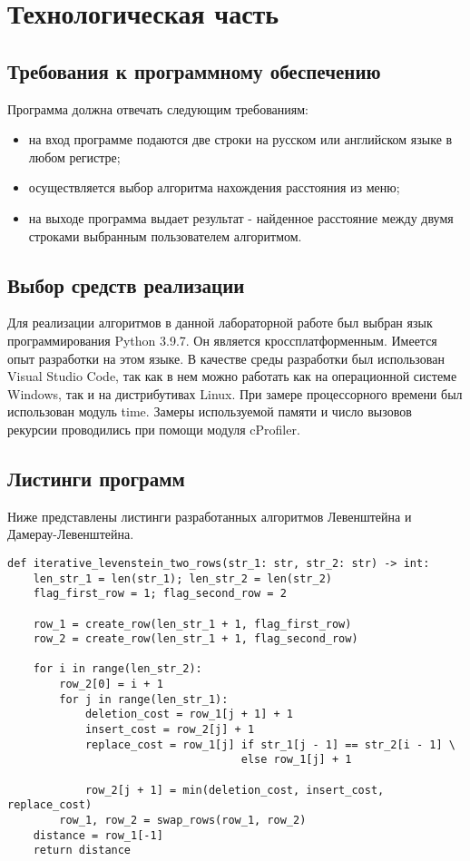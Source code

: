 \chapter{Технологическая часть}
\section{Требования к программному обеспечению}
Программа должна отвечать следующим требованиям:
\begin{itemize}
	\item на вход программе подаются две строки на русском или английском языке в любом регистре;
	\item осуществляется выбор алгоритма нахождения расстояния из меню;
	\item на выходе программа выдает результат - найденное расстояние между двумя строками выбранным пользователем алгоритмом.
\end{itemize}

\section{Выбор средств реализации}
Для реализации алгоритмов в данной лабораторной работе был выбран язык программирования Python 3.9.7\cite{python3}. Он является кроссплатформенным. Имеется опыт разработки на этом языке. В качестве среды разработки был использован Visual Studio Code\cite{vs}, так как в нем можно работать как на операционной системе Windows, так и на дистрибутивах Linux. При замере процессорного времени был использован модуль time\cite{time}. Замеры используемой памяти и число вызовов рекурсии проводились при помощи модуля cProfiler\cite{cprofile}.
\section{Листинги программ}
Ниже представлены листинги разработанных алгоритмов Левенштейна и Дамерау-Левенштейна.

\begin{lstlisting}[label=some-code,caption=Программный код нахождения расстояния Левенштейна итеративно с использованием двух строк]
def iterative_levenstein_two_rows(str_1: str, str_2: str) -> int:
	len_str_1 = len(str_1); len_str_2 = len(str_2)
	flag_first_row = 1; flag_second_row = 2
	
	row_1 = create_row(len_str_1 + 1, flag_first_row)
	row_2 = create_row(len_str_1 + 1, flag_second_row)
	
	for i in range(len_str_2):
		row_2[0] = i + 1
		for j in range(len_str_1):
			deletion_cost = row_1[j + 1] + 1
			insert_cost = row_2[j] + 1
			replace_cost = row_1[j] if str_1[j - 1] == str_2[i - 1] \
									else row_1[j] + 1
	
			row_2[j + 1] = min(deletion_cost, insert_cost, replace_cost)
		row_1, row_2 = swap_rows(row_1, row_2)
	distance = row_1[-1]
	return distance
\end{lstlisting}

